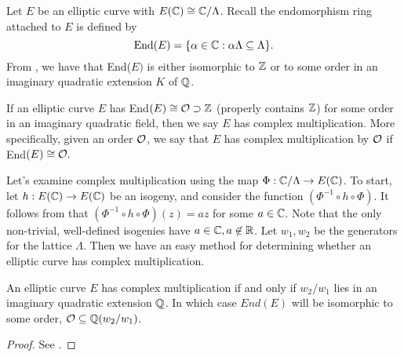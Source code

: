 Let $E$ be an elliptic curve with $E(\mathbb{C}) \cong \mathbb{C}/\Lambda$. Recall the endomorphism ring attached to $E$ is defined by
$$\text{End}(E) = \{\alpha \in \mathbb{C} : \alpha\Lambda \subseteq \Lambda\}.$$
From \cite[Page 102]{Silverman}, we have that End($E)$ is either isomorphic to $\mathbb{Z}$ or to some order in an imaginary quadratic extension $K$ of $\mathbb{Q}$.
\begin{definition}
If an elliptic curve $E$ has End$(E) \cong \mathcal{O} \supset \mathbb{Z}$ (properly contains $\mathbb{Z}$) for some order in an imaginary quadratic field, then we say $E$ has complex multiplication. More specifically, given an order $\mathcal{O}$, we say that $E$ has complex multiplication by $\mathcal{O}$ if End$(E) \cong \mathcal{O}.$
\end{definition}
Let's examine complex multiplication using the map $\Phi:\mathbb{C}/\Lambda \to E(\mathbb{C})$. To start, let $h:E(\mathbb{C}) \to E(\mathbb{C})$ be an isogeny, and consider the function $(\Phi^{-1} \circ h \circ \Phi)$. It follows from \cite[Lemma 6.18]{Knapp} that $(\Phi^{-1} \circ h \circ \Phi)(z) = az$ for some $a \in \mathbb{C}$. Note that the only non-trivial, well-defined isogenies have $a \in \mathbb{C}, a \not\in \mathbb{R}$. Let $w_1, w_2$ be the generators for the lattice $\Lambda$. Then we have an easy method for determining whether an elliptic curve has complex multiplication.

\begin{prop} An elliptic curve $E$ has complex multiplication if and only if $w_2/w_1$ lies in an imaginary quadratic extension $\mathbb{Q}$. In which case $End(E)$ will be isomorphic to some order, $\mathcal{O} \subseteq \mathbb{Q}(w_2/w_1)$.
\end{prop}
\begin{proof}
See \cite[Page 176]{Silverman}.
\end{proof}



